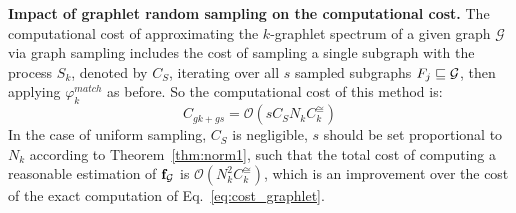 \noindent\textbf{Impact of graphlet random sampling on the computational cost. }
The computational cost of approximating the $k$-graphlet spectrum of a given graph $\mathcal{G}$ via graph sampling includes the cost of sampling a single subgraph with the process $S_k$, denoted by $C_S$, iterating over all $s$ sampled subgraphs $F_j\sqsubseteq \mathcal{G}$, then applying $\varphi^{match}_k$ as before. So the computational cost of this method is:
\begin{equation}
\label{eq:cost_graphlet_sampling}
C_{gk + gs}= \mathcal{O}\left(s C_S N_k C^{\cong}_k\right)
\end{equation}
In the case of uniform sampling, $C_S$ is negligible, $s$ should be set proportional to $N_k$ according to Theorem~\ref{thm:norm1}, such that the total cost of computing a reasonable estimation of $\mathbf{f}_{\mathcal{G}}$ is $\mathcal{O}\left(N_k^2 C^{\cong}_k\right)$, which is an improvement over the cost of the exact computation of Eq.~\eqref{eq:cost_graphlet}. 


